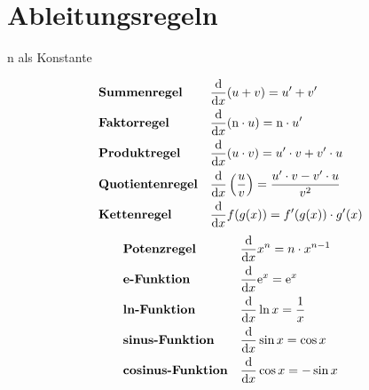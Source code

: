\documentclass{article}
\begin{document}
\section{Ableitungsregeln}
$\mathrm{n}$ als Konstante 
\begin{multicols}{2} 
 \noindent \begin{align*}
  &\text{\textbf{Summenregel}} &&\frac{\mathrm{d}}{\mathrm{d}x} (u + v) = u' + v' \\
  &\text{\textbf{Faktorregel}} &&\frac{\mathrm{d}}{\mathrm{d}x} (\mathrm{n} \cdot u) = \mathrm{n} \cdot u' \\  
  &\text{\textbf{Produktregel}} &&\frac{\mathrm{d}}{\mathrm{d}x} (u \cdot v) = u' \cdot v + v' \cdot u \\
  &\text{\textbf{Quotientenregel}} &&\frac{\mathrm{d}}{\mathrm{d}x} \left( \frac{u}{v} \right) = \frac{u' \cdot v - v' \cdot u}{v^2} \\
 &\text{\textbf{Kettenregel}} &&\frac{\mathrm{d}}{\mathrm{d}x} f(g(x)) = f'(g(x)) \cdot g'(x) \\
 \end{align*} 
 \begin{align*}
  &\text{\textbf{Potenzregel}} &&\frac{\mathrm{d}}{\mathrm{d}x} x^n = n \cdot x^{n-1} \\ 
  &\text{\textbf{e-Funktion}} &&\frac{\mathrm{d}}{\mathrm{d}x} \mathrm{e}^x = \mathrm{e}^x \\
  &\text{\textbf{ln-Funktion}} &&\frac{\mathrm{d}}{\mathrm{d}x} \ln x = \frac{1}{x} \\
  &\text{\textbf{sinus-Funktion}} &&\frac{\mathrm{d}}{\mathrm{d}x} \sin x = \cos x \\
  &\text{\textbf{cosinus-Funktion}} &&\frac{\mathrm{d}}{\mathrm{d}x} \cos x = -\sin x
 \end{align*} 
\end{multicols} 
\end{document}
